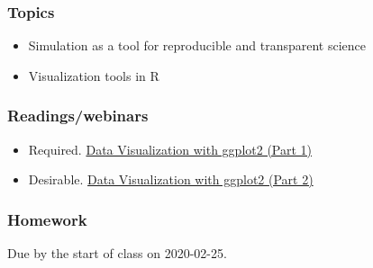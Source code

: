 \documentclass[
]{article}
\providecommand{\tightlist}{%
  \setlength{\itemsep}{0pt}\setlength{\parskip}{0pt}}
\begin{document}
\hypertarget{topics-5}{%
\subsubsection{Topics}\label{topics-5}}

\begin{itemize}
\tightlist
\item
  Simulation as a tool for reproducible and transparent science
\item
  Visualization tools in R
\end{itemize}

\hypertarget{readingswebinars-4}{%
\subsubsection{Readings/webinars}\label{readingswebinars-4}}

\begin{itemize}
\tightlist
\item
  Required.
  \href{https://www.datacamp.com/courses/data-visualization-with-ggplot2-1}{Data
  Visualization with ggplot2 (Part 1)}
\item
  Desirable.
  \href{https://www.datacamp.com/courses/data-visualization-with-ggplot2-2}{Data
  Visualization with ggplot2 (Part 2)}
\end{itemize}

\hypertarget{homework-5}{%
\subsubsection{Homework}\label{homework-5}}

Due by the start of class on 2020-02-25.
\end{document}
